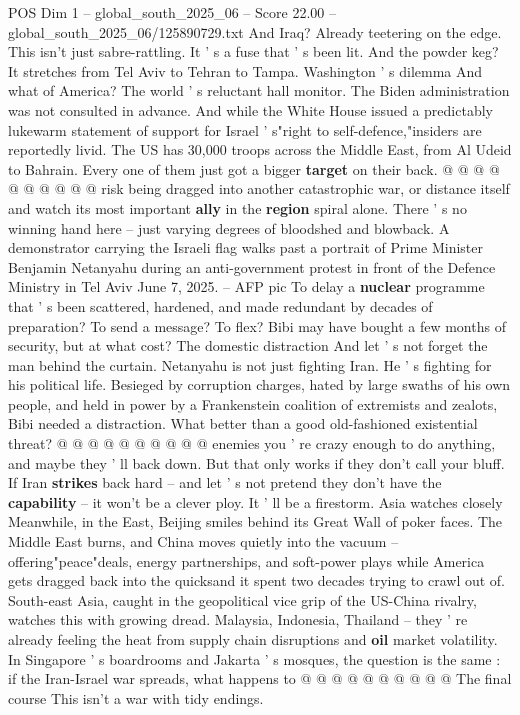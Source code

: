 \begin{textsample}{POS Dim 1 – global\_south\_2025\_06 – Score 22.00 – global\_south\_2025\_06/125890729.txt}
And Iraq?
Already teetering on the edge.
This isn't just sabre-rattling.
It ' s a fuse that ' s been lit.
And the powder keg?
It stretches from Tel Aviv to Tehran to Tampa.
Washington ' s dilemma And what of America?
The world ' s reluctant hall monitor.
The Biden administration was not consulted in advance.
And while the White House issued a predictably lukewarm statement of support for Israel ' s"right to self-defence,"insiders are reportedly livid.
The US has 30,000 troops across the Middle East, from Al Udeid to Bahrain.
Every one of them just got a bigger \textbf{target} on their back. @ @ @ @ @ @ @ @ @ @ risk being dragged into another catastrophic war, or distance itself and watch its most important \textbf{ally} in the \textbf{region} spiral alone.
There ' s no winning hand here -- just varying degrees of bloodshed and blowback.
A demonstrator carrying the Israeli flag walks past a portrait of Prime Minister Benjamin Netanyahu during an anti-government protest in front of the Defence Ministry in Tel Aviv June 7, 2025. -- AFP pic To delay a \textbf{nuclear} programme that ' s been scattered, hardened, and made redundant by decades of preparation?
To send a message?
To flex?
Bibi may have bought a few months of security, but at what cost?
The domestic distraction And let ' s not forget the man behind the curtain.
Netanyahu is not just fighting Iran.
He ' s fighting for his political life.
Besieged by corruption charges, hated by large swaths of his own people, and held in power by a Frankenstein coalition of extremists and zealots, Bibi needed a distraction.
What better than a good old-fashioned existential threat? @ @ @ @ @ @ @ @ @ @ enemies you ' re crazy enough to do anything, and maybe they ' ll back down.
But that only works if they don't call your bluff.
If Iran \textbf{strikes} back hard -- and let ' s not pretend they don't have the \textbf{capability} -- it won't be a clever ploy.
It ' ll be a firestorm.
Asia watches closely Meanwhile, in the East, Beijing smiles behind its Great Wall of poker faces.
The Middle East burns, and China moves quietly into the vacuum -- offering"peace"deals, energy partnerships, and soft-power plays while America gets dragged back into the quicksand it spent two decades trying to crawl out of.
South-east Asia, caught in the geopolitical vice grip of the US-China rivalry, watches this with growing dread.
Malaysia, Indonesia, Thailand -- they ' re already feeling the heat from supply chain disruptions and \textbf{oil} market volatility.
In Singapore ' s boardrooms and Jakarta ' s mosques, the question is the same : if the Iran-Israel war spreads, what happens to @ @ @ @ @ @ @ @ @ @ The final course This isn't a war with tidy endings.

\end{textsample}
